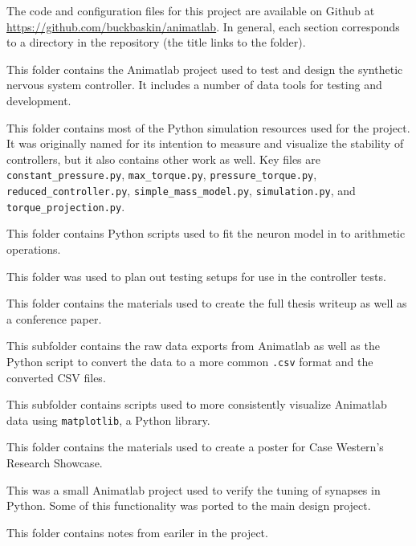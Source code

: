The code and configuration files for this project are available on Github at \url{https://github.com/buckbaskin/animatlab}. In general, each section corresponds to a directory in the repository (the title links to the folder).


This folder contains the Animatlab project used to test and design the synthetic nervous system controller. It includes a number of data tools for testing and development.


This folder contains most of the Python simulation resources used for the project. It was originally named for its intention to measure and visualize the stability of controllers, but it also contains other work as well. Key files are \texttt{constant\_pressure.py}, \texttt{max\_torque.py}, \texttt{pressure\_torque.py}, \texttt{reduced\_controller.py}, \texttt{simple\_mass\_model.py}, \texttt{simulation.py}, and \texttt{torque\_projection.py}.


This folder contains Python scripts used to fit the neuron model in \cite{NickFunctionalSubnetwork} to arithmetic operations.


This folder was used to plan out testing setups for use in the controller tests.


This folder contains the materials used to create the full thesis writeup as well as a conference paper.


This subfolder contains the raw data exports from Animatlab as well as the Python script to convert the data to a more common \texttt{.csv} format and the converted CSV files.


This subfolder contains scripts used to more consistently visualize Animatlab data using \texttt{matplotlib}, a Python library.


This folder contains the materials used to create a poster for Case Western's Research Showcase.


This was a small Animatlab project used to verify the tuning of synapses in Python. Some of this functionality was ported to the main design project.


This folder contains notes from eariler in the project.